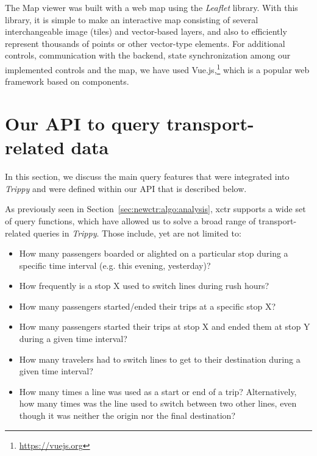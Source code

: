     The Map viewer was built with a web map using the {\em Leaflet} library. With this library, it is simple to make an interactive map consisting of several interchangeable image (tiles) and \mbox{vector-based} layers, and also to efficiently represent thousands of points or other vector-type elements.
    For additional controls, communication with the backend, state synchronization among our implemented controls and the map, we have used Vue.js,\footnote{\url{https://vuejs.org}} which is a popular web framework based on components.

	
	\section{Our API to query transport-related data}
	\label{sec:api}
	In this section, we discuss the main query features that were integrated into {\em Trippy} and were defined within our API that is described below.
	
    As previously seen in Section~\ref{sec:newctr:algo:analysis}, \gls{xctr} supports a wide set of query functions, which have allowed us to solve a broad range of transport-related queries in {\em Trippy}. Those include, yet are not limited to:

    \begin{itemize}
    \item How many passengers boarded or alighted on a particular stop during a specific time interval (e.g. this evening, yesterday)?
    \item How frequently is a stop X used to switch lines during rush hours?
    \item How many passengers started/ended their trips at a specific stop X?
    \item How many passengers started their trips at stop X and ended them at stop Y during a given time interval?
    \item How many travelers had to switch lines to get to their destination during a given time interval?
    \item How many times a line was used as a start or end of a trip? Alternatively, how many times was the line used to switch between two other lines, even though it was neither the origin nor the final destination?
    \end{itemize}
    
